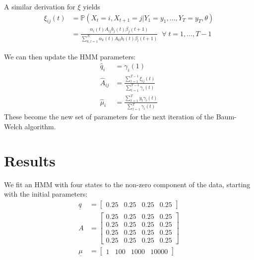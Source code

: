 \documentclass[11pt, twoside]{article}
\begin{document}
A similar derivation for $\xi$ yields
\begin{align*}
	\xi_{ij}(t) &= \mathbb{P}(X_t=i, X_{t+1}=j | Y_1=y_1, \ldots, Y_T=y_T, \theta) \\
	            &= \frac{\alpha_i(t) A_{ij} b_j(t) \beta_j(t+1)}{\sum_{k,l=1}^N \alpha_k(t) A_{kl} b_l(t) \beta_l(t+1)} \; \; \forall \; t = 1, \ldots, T-1
\end{align*}

We can then update the HMM parameters:
\begin{align*}
	\hat{q}_i &= \gamma_i(1) \\
	\hat{ A}_{ij} &= \frac{\sum_{t=1}^{T-1} \xi_{ij}(t)}{\sum_{t=1}^{T-1} \gamma_i(t)} \\
	\hat{\mu}_i &= \frac{\sum_{t=1}^T y_t \gamma_i(t)}{\sum_{t=1}^{T} \gamma_i(t)}
\end{align*}
These become the new set of parameters for the next iteration of the Baum-Welch algorithm.

\section{Results}

We fit an HMM with four states to the non-zero component of the data, starting with the initial parameters:
\begin{align*}
	\underline{q} &= [ \begin{array}{cccc}
	0.25 & 0.25 & 0.25 & 0.25 \end{array} ] \\
	A &= \left[ \begin{array}{cccc}
	0.25 & 0.25 & 0.25 & 0.25 \\
	0.25 & 0.25 & 0.25 & 0.25 \\
	0.25 & 0.25 & 0.25 & 0.25 \\
	0.25 & 0.25 & 0.25 & 0.25 \end{array} \right] \\
	\underline{\mu} &= [ \begin{array}{cccc}
	1 & 100 & 1000 & 10000 \end{array} ] \\
\end{align*}
\end{document}

